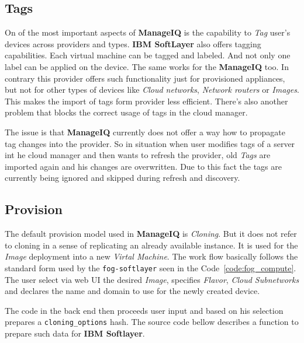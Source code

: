 \subsection{Tags}
\label{sub:Tags}

On of the most important aspects of \textbf{ManageIQ} is the capability to \emph{Tag} user's devices across providers and types. \textbf{IBM SoftLayer} also offers tagging capabilities. Each virtual machine can be tagged and labeled. And not only one label can be applied on the device. The same works for the \textbf{ManageIQ} too. In contrary this provider offers such functionality just for provisioned appliances, but not for other types of devices like \emph{Cloud networks}, \emph{Network routers} or \emph{Images}. This makes the import of tags form provider less efficient. There's also another problem that blocks the correct usage of tags in the cloud manager.

The issue is that \textbf{ManageIQ} currently does not offer a way how to propagate tag changes into the provider. So in situation when user modifies tags of a server int he cloud manager and then wants to refresh the provider, old \emph{Tags} are imported again and his changes are overwritten. Due to this fact the tags are currently being ignored and skipped during refresh and discovery.

\clearpage
\subsection{Provision}
\label{sub:Provision}

The default provision model used in \textbf{ManageIQ} is \emph{Cloning}. But it does not refer to cloning in a sense of replicating an already available instance. It is used for the \emph{Image} deployment into a new \emph{Virtal Machine}.
The work flow basically follows the standard form used by the \texttt{fog-softlayer} seen in the Code~\ref{code:fog_compute}. The user select via web UI the desired \emph{Image}, specifies \emph{Flavor}, \emph{Cloud Subnetworks} and declares the name and domain to use for the newly created device.

The code in the back end then proceeds user input and based on his selection prepares a \texttt{cloning\_options} hash. The source code bellow describes a function to prepare such data for \textbf{IBM Softlayer}.

